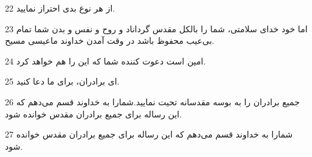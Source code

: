 \par 22 از هر نوع بدی احتراز نمایید.
\par 23 اما خود خدای سلامتی، شما را بالکل مقدس گرداناد و روح و نفس و بدن شما تمام بی‌عیب محفوظ باشد در وقت آمدن خداوند ماعیسی مسیح.
\par 24 امین است دعوت کننده شما که این را هم خواهد کرد.
\par 25 ‌ای برادران، برای ما دعا کنید.
\par 26 جمیع برادران را به بوسه مقدسانه تحیت نمایید.شمارا به خداوند قسم می‌دهم که این رساله برای جمیع برادران مقدس خوانده شود.
\par 27 شمارا به خداوند قسم می‌دهم که این رساله برای جمیع برادران مقدس خوانده شود.



